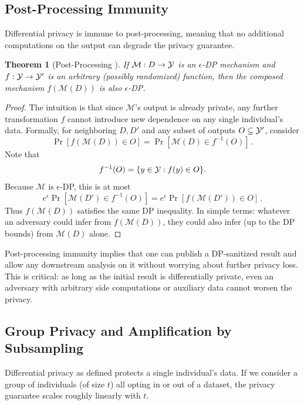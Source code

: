 \documentclass[11pt, a4paper]{article}
\newtheorem{theorem}{Theorem}
\begin{document}
\subsection{Post-Processing Immunity}

Differential privacy is immune to post-processing, meaning that no additional computations on the output can degrade the privacy guarantee.

\begin{theorem}[Post-Processing \cite{DworkRoth2014}]
If $\mathcal{M}: D \to {\cal Y}$ is an $\epsilon$-DP mechanism and $f: {\cal Y} \to {\cal Y}'$ is an arbitrary (possibly randomized) function, 
then the composed mechanism $f(\mathcal{M}(D))$ is also $\epsilon$-DP.
\end{theorem}

\begin{proof}
The intuition is that since $\mathcal{M}$'s output is already private, any further transformation $f$ cannot introduce new dependence on any single individual's data.
Formally, for neighboring $D, D'$ and any subset of outputs $O \subseteq {\cal Y}'$, consider 
\[ \Pr[f(\mathcal{M}(D)) \in O] = \Pr[\mathcal{M}(D) \in f^{-1}(O)] \,. \] 
Note that
\begin{align}
    f^{-1}(O) = \{y \in {\cal Y} : f(y)\in O\}.
\end{align}
Because $\mathcal{M}$ is $\epsilon$-DP, this is at most 
\[ e^{\epsilon} \Pr[\mathcal{M}(D') \in f^{-1}(O)] = e^{\epsilon} \Pr[f(\mathcal{M}(D')) \in O] \,.\] 
Thus $f(\mathcal{M}(D))$ satisfies the same DP inequality. In simple terms: whatever an adversary could infer from $f(\mathcal{M}(D))$,
they could also infer (up to the DP bounds) from $\mathcal{M}(D)$ alone.
\end{proof}

Post-processing immunity implies that one can publish a DP-sanitized result and allow any downstream analysis on it without worrying about further privacy loss.
This is critical: as long as the initial result is differentially private, even an adversary with arbitrary side computations or auxiliary data cannot worsen the privacy.

\subsection{Group Privacy and Amplification by Subsampling}

Differential privacy as defined protects a single individual's data.
If we consider a group of individuals (of size $t$) all opting in or out of a dataset, the privacy guarantee scales roughly linearly with $t$.
\end{document}

